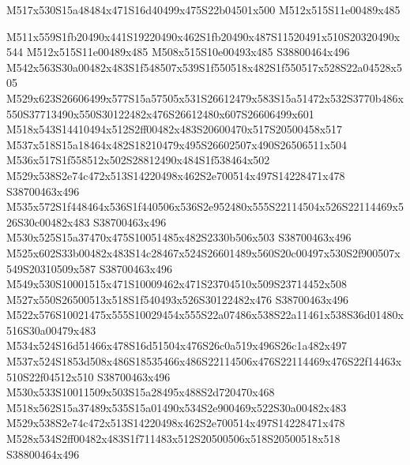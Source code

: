 \documentclass{article}
\begin{document}
\begin{multicols}{2}
\begin{center}
M517x530S15a48484x471S16d40499x475S22b04501x500 M512x515S11e00489x485 
\end{center}



M511x559S1fb20490x441S19220490x462S1fb20490x487S11520491x510S20320490x544 M512x515S11e00489x485 M508x515S10e00493x485 S38800464x496 M542x563S30a00482x483S1f548507x539S1f550518x482S1f550517x528S22a04528x505 M529x623S26606499x577S15a57505x531S26612479x583S15a51472x532S3770b486x550S37713490x550S30122482x476S26612480x607S26606499x601 M518x543S14410494x512S2ff00482x483S20600470x517S20500458x517 M537x518S15a18464x482S18210479x495S26602507x490S26506511x504 M536x517S1f558512x502S28812490x484S1f538464x502 M529x538S2e74c472x513S14220498x462S2e700514x497S14228471x478 S38700463x496 M535x572S1f448464x536S1f440506x536S2e952480x555S22114504x526S22114469x526S30c00482x483 S38700463x496 M530x525S15a37470x475S10051485x482S2330b506x503 S38700463x496 M525x602S33b00482x483S14c28467x524S26601489x560S20c00497x530S2f900507x549S20310509x587 S38700463x496 M549x530S10001515x471S10009462x471S23704510x509S23714452x508 M527x550S26500513x518S1f540493x526S30122482x476 S38700463x496 M522x576S10021475x555S10029454x555S22a07486x538S22a11461x538S36d01480x516S30a00479x483 M534x524S16d51466x478S16d51504x476S26c0a519x496S26c1a482x497 M537x524S1853d508x486S18535466x486S22114506x476S22114469x476S22f14463x510S22f04512x510 S38700463x496 M530x533S10011509x503S15a28495x488S2d720470x468 M518x562S15a37489x535S15a01490x534S2e900469x522S30a00482x483 M529x538S2e74c472x513S14220498x462S2e700514x497S14228471x478 M528x534S2ff00482x483S1f711483x512S20500506x518S20500518x518 S38800464x496






\end{multicols}
\end{document}
